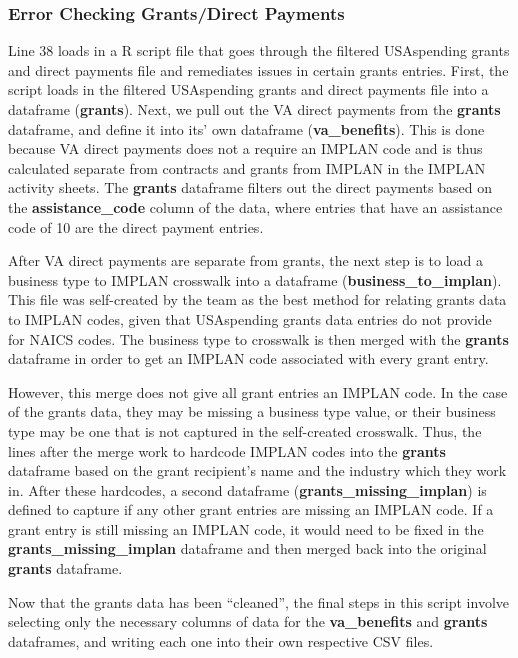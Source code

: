 \documentclass[
]{book}
\begin{document}
\hypertarget{error-checking-grantsdirect-payments}{%
\subsubsection{Error Checking Grants/Direct Payments}\label{error-checking-grantsdirect-payments}}

Line 38 loads in a R script file that goes through the filtered USAspending grants and direct payments file and remediates issues in certain grants entries. First, the script loads in the filtered USAspending grants and direct payments file into a dataframe (\textbf{grants}). Next, we pull out the VA direct payments from the \textbf{grants} dataframe, and define it into its' own dataframe (\textbf{va\_benefits}). This is done because VA direct payments does not a require an IMPLAN code and is thus calculated separate from contracts and grants from IMPLAN in the IMPLAN activity sheets. The \textbf{grants} dataframe filters out the direct payments based on the \textbf{assistance\_code} column of the data, where entries that have an assistance code of 10 are the direct payment entries.

After VA direct payments are separate from grants, the next step is to load a business type to IMPLAN crosswalk into a dataframe (\textbf{business\_to\_implan}). This file was self-created by the team as the best method for relating grants data to IMPLAN codes, given that USAspending grants data entries do not provide for NAICS codes. The business type to crosswalk is then merged with the \textbf{grants} dataframe in order to get an IMPLAN code associated with every grant entry.

However, this merge does not give all grant entries an IMPLAN code. In the case of the grants data, they may be missing a business type value, or their business type may be one that is not captured in the self-created crosswalk. Thus, the lines after the merge work to hardcode IMPLAN codes into the \textbf{grants} dataframe based on the grant recipient's name and the industry which they work in. After these hardcodes, a second dataframe (\textbf{grants\_missing\_implan}) is defined to capture if any other grant entries are missing an IMPLAN code. If a grant entry is still missing an IMPLAN code, it would need to be fixed in the \textbf{grants\_missing\_implan} dataframe and then merged back into the original \textbf{grants} dataframe.

Now that the grants data has been ``cleaned'', the final steps in this script involve selecting only the necessary columns of data for the \textbf{va\_benefits} and \textbf{grants} dataframes, and writing each one into their own respective CSV files.
\end{document}
